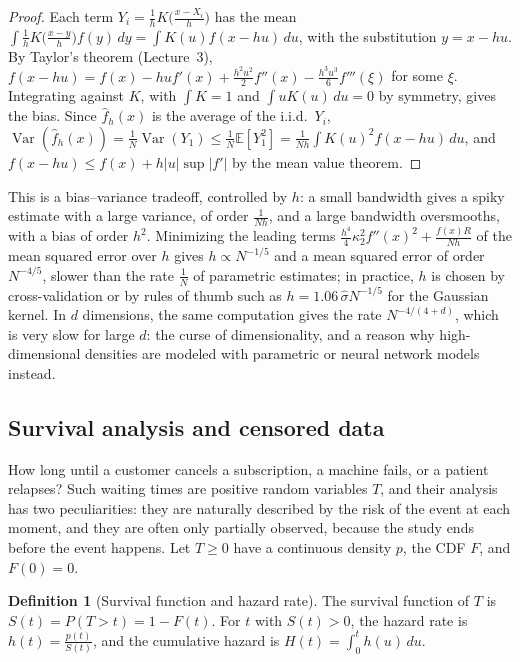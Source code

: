\documentclass[11pt]{article}
\newcommand{\E}{\mathbb{E}}
\DeclareMathOperator{\Var}{Var}
\theoremstyle{definition}
\newtheorem{definition}{Definition}[section]
\theoremstyle{plain}
\theoremstyle{remark}
\begin{document}
\begin{proof}
    Each term $Y_i = \frac{1}{h}K\big(\frac{x - X_i}{h}\big)$ has the mean $\int \frac{1}{h}K\big(\frac{x - y}{h}\big)f(y)\, dy = \int K(u)f(x - hu)\, du$, with the substitution $y = x - hu$. By Taylor's theorem (Lecture~3), $f(x - hu) = f(x) - huf'(x) + \frac{h^2u^2}{2}f''(x) - \frac{h^3u^3}{6}f'''(\xi)$ for some $\xi$. Integrating against $K$, with $\int K = 1$ and $\int uK(u)\, du = 0$ by symmetry, gives the bias. Since $\hat f_h(x)$ is the average of the i.i.d.\ $Y_i$, $\Var(\hat f_h(x)) = \frac{1}{N}\Var(Y_1) \leq \frac{1}{N}\E[Y_1^2] = \frac{1}{Nh}\int K(u)^2f(x - hu)\, du$, and $f(x - hu) \leq f(x) + h|u|\sup|f'|$ by the mean value theorem.
\end{proof}

This is a bias--variance tradeoff, controlled by $h$: a small bandwidth gives a spiky estimate with a large variance, of order $\frac{1}{Nh}$, and a large bandwidth oversmooths, with a bias of order $h^2$. Minimizing the leading terms $\frac{h^4}{4}\kappa_2^2f''(x)^2 + \frac{f(x)R}{Nh}$ of the mean squared error over $h$ gives $h \propto N^{-1/5}$ and a mean squared error of order $N^{-4/5}$, slower than the rate $\frac{1}{N}$ of parametric estimates; in practice, $h$ is chosen by cross-validation or by rules of thumb such as $h = 1.06\,\hat\sigma N^{-1/5}$ for the Gaussian kernel. In $d$ dimensions, the same computation gives the rate $N^{-4/(4+d)}$, which is very slow for large $d$: the curse of dimensionality, and a reason why high-dimensional densities are modeled with parametric or neural network models instead.

\subsection{Survival analysis and censored data}\label{sec:survival}

How long until a customer cancels a subscription, a machine fails, or a patient relapses? Such waiting times are positive random variables $T$, and their analysis has two peculiarities: they are naturally described by the risk of the event at each moment, and they are often only partially observed, because the study ends before the event happens. Let $T \geq 0$ have a continuous density $p$, the CDF $F$, and $F(0) = 0$.

\begin{definition}[Survival function and hazard rate]\label{def:hazard}
    The survival function of $T$ is $S(t) = P(T > t) = 1 - F(t)$. For $t$ with $S(t) > 0$, the hazard rate is $h(t) = \frac{p(t)}{S(t)}$, and the cumulative hazard is $H(t) = \int_0^t h(u)\, du$.
\end{definition}
\end{document}
